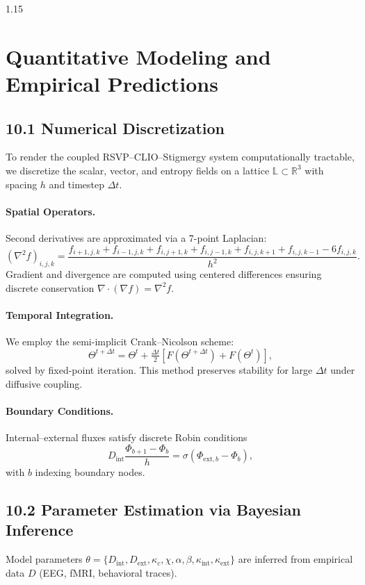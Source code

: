 \documentclass[12pt,a4paper]{article}
\begin{document}
\begin{spacing}{1.15}
\section{Quantitative Modeling and Empirical Predictions}

\subsection{10.1 Numerical Discretization}

To render the coupled RSVP–CLIO–Stigmergy system computationally tractable, we discretize the scalar, vector, and entropy fields on a lattice
$\mathbb{L}\subset\mathbb{R}^3$ with spacing $h$ and timestep $\Delta t$.

\paragraph{Spatial Operators.}
Second derivatives are approximated via a 7-point Laplacian:
\[
(\nabla^2 f)_{i,j,k}
  = \frac{f_{i+1,j,k}+f_{i-1,j,k}+f_{i,j+1,k}+f_{i,j-1,k}
         +f_{i,j,k+1}+f_{i,j,k-1}-6f_{i,j,k}}{h^2}.
\]
Gradient and divergence are computed using centered differences ensuring discrete conservation
$\nabla\!\cdot\!(\nabla f)=\nabla^2 f$.

\paragraph{Temporal Integration.}
We employ the semi-implicit Crank–Nicolson scheme:
\[
\Theta^{t+\Delta t}=\Theta^t+\tfrac{\Delta t}{2}\!\left[
F(\Theta^{t+\Delta t})+F(\Theta^{t})\right],
\]
solved by fixed-point iteration.  This method preserves stability for large $\Delta t$ under diffusive coupling.

\paragraph{Boundary Conditions.}
Internal–external fluxes satisfy discrete Robin conditions
\[
D_{\mathrm{int}}\!\frac{\Phi_{b+1}-\Phi_{b}}{h}
   = \sigma(\Phi_{\mathrm{ext},b}-\Phi_{b}),
\]
with $b$ indexing boundary nodes.

\subsection{10.2 Parameter Estimation via Bayesian Inference}

Model parameters
$\theta=\{D_{\mathrm{int}},D_{\mathrm{ext}},\kappa_c,\chi,
  \alpha,\beta,\kappa_{\mathrm{int}},\kappa_{\mathrm{ext}}\}$
are inferred from empirical data $D$ (EEG, fMRI, behavioral traces).


\end{spacing}
\end{document}

